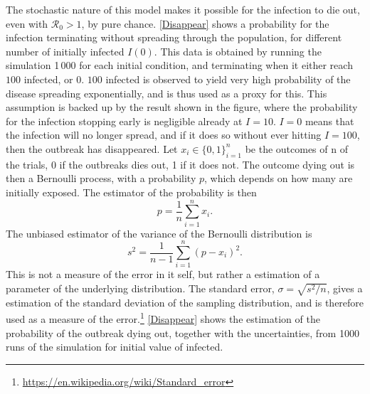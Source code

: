 \documentclass{article}
\begin{document}
    The stochastic nature of this model makes it possible for the infection to die out, even with $\mathcal{R}_0>1$, by pure chance. 
    \autoref{Disappear} shows a probability for the infection terminating without spreading through the population, for different number of initially infected $I(0)$.
    This data is obtained by running the simulation 1\,000 for each initial condition, and terminating when it either reach $100$ infected, or $0$.
    $100$ infected is observed to yield very high probability of the disease spreading exponentially, and is thus used as a proxy for this.
    This assumption is backed up by the result shown in the figure, where the probability for the infection stopping early is negligible already at $I=10$. 
    $I=0$ means that the infection will no longer spread, and if it does so without ever hitting $I=100$, then the outbreak has disappeared.
    Let $x_i\in\{0, 1\}_{i=1}^n$ be the outcomes of n of the trials, 0 if the outbreaks dies out, 1 if it does not.
    The outcome dying out is then a Bernoulli process, with a probability $p$, which depends on how many are initially exposed.
    The estimator of the probability is then
    \begin{equation*}
        p = \frac{1}{n}\sum_{i=1}^n x_i.
    \end{equation*}
    The unbiased estimator of the variance of the Bernoulli distribution is
    \begin{equation*}
        s^2 = \frac{1}{n-1} \sum_{i=1}^n (p - x_i)^2.
    \end{equation*}
    This is not a measure of the error in it self, but rather a estimation of a parameter of the underlying distribution. 
    The standard error, $\sigma = \sqrt{s^2/n}$, gives a estimation of the standard deviation of the sampling distribution, and is therefore used as a measure of the error.\footnote{\url{https://en.wikipedia.org/wiki/Standard_error}} 
    \autoref{Disappear} shows the estimation of the probability of the outbreak dying out, together with the uncertainties, from 1000 runs of the simulation for initial value of infected.
\end{document}
